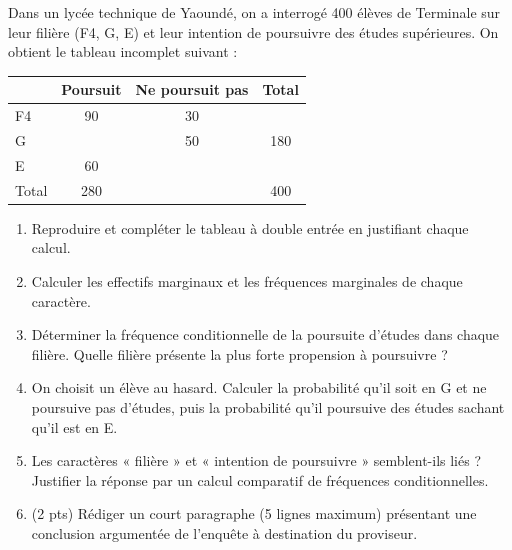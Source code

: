 \documentclass[11pt]{article}
\begin{document}
\begin{exercice}
Dans un lycée technique de Yaoundé, on a interrogé 400 élèves de Terminale sur leur filière (F4, G, E) et leur intention de poursuivre des études supérieures. On obtient le tableau incomplet suivant :

\begin{center}
\begin{tabular}{|l|c|c|c|}
\hline
 & Poursuit & Ne poursuit pas & Total \\
\hline
F4 & 90 & 30 & \\
\hline
G & & 50 & 180 \\
\hline
E & 60 & & \\
\hline
Total & 280 & & 400 \\
\hline
\end{tabular}
\end{center}

\begin{enumerate}
\item Reproduire et compléter le tableau à double entrée en justifiant chaque calcul.
\item Calculer les effectifs marginaux et les fréquences marginales de chaque caractère.
\item Déterminer la fréquence conditionnelle de la poursuite d'études dans chaque filière. Quelle filière présente la plus forte propension à poursuivre ?
\item On choisit un élève au hasard. Calculer la probabilité qu'il soit en G et ne poursuive pas d'études, puis la probabilité qu'il poursuive des études sachant qu'il est en E.
\item Les caractères « filière » et « intention de poursuivre » semblent-ils liés ? Justifier la réponse par un calcul comparatif de fréquences conditionnelles.
\item (2 pts) Rédiger un court paragraphe (5 lignes maximum) présentant une conclusion argumentée de l'enquête à destination du proviseur.
\end{enumerate}
\end{exercice}
\end{document}
